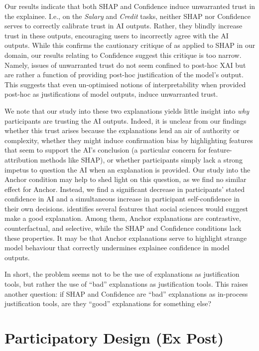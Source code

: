 Our results indicate that both SHAP and Confidence induce unwarranted trust in the explainee. I.e., on the \emph{Salary} and \emph{Credit} tasks, neither SHAP nor Confidence serves to correctly calibrate trust in AI outputs. Rather, they blindly increase trust in these outputs, encouraging users to incorrectly agree with the AI outputs. While this confirms the cautionary critique of \textcite{Lipton} as applied to SHAP in our domain, our results relating to Confidence suggest this critique is too narrow. Namely, issues of unwarranted trust do not seem confined to post-hoc XAI but are rather a function of providing post-hoc justification of the model's output. This suggests that even un-optimised notions of interpretability when provided post-hoc as justifications of model outputs, induce unwarranted trust.

We note that our study into these two explanations yields little insight into \emph{why} participants are trusting the AI outputs. Indeed, it is unclear from our findings whether this trust arises because the explanations lend an air of authority or complexity, whether they might induce confirmation bias by highlighting features that seem to support the AI's conclusion (a particular concern for feature-attribution methods like SHAP), or whether participants simply lack a strong impetus to question the AI when an explanation is provided. Our study into the Anchor condition may help to shed light on this question, as we find no similar effect for Anchor. Instead, we find a significant decrease in participants' stated confidence in AI and a simultaneous increase in participant self-confidence in their own decisions. \textcite{miller_explanation_2017} identifies several features that social sciences would suggest make a good explanation. Among them, Anchor explanations are contrastive, counterfactual, and selective, while the SHAP and Confidence conditions lack these properties. It may be that Anchor explanations serve to highlight strange model behaviour that correctly undermines explainee confidence in model outputs. 

In short, the problem seems not to be the use of explanations as justification tools, but rather the use of ``bad'' explanations as justification tools. This raises another question: if SHAP and Confidence are ``bad'' explanations as in-process justification tools, are they ``good'' explanations for something else?

\section[Participatory Design]{Participatory Design (Ex Post)}\label{sec:xaicase}
